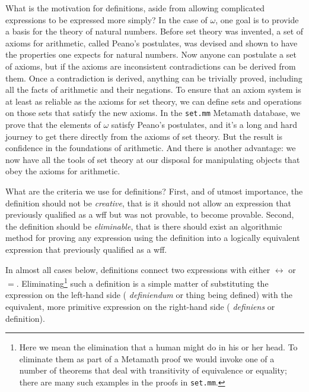 What is the motivation for definitions, aside from allowing complicated
expressions to be expressed more simply?  In the case of  $\omega$, one goal is
to provide a basis for the theory of natural numbers.
Before set theory was invented, a set of axioms for arithmetic, called Peano's
postulates, was devised and shown to have the
properties one expects for natural numbers.  Now anyone can postulate a
set of axioms, but if the axioms are inconsistent contradictions can be derived
from them.  Once a contradiction is derived, anything can be trivially
proved, including
all the facts of arithmetic and their negations.  To ensure that an
axiom system is at least as reliable as the axioms for set theory, we can
define sets and operations on those sets that satisfy the new axioms. In the
\texttt{set.mm} Metamath database, we prove that the elements of $\omega$ satisfy
Peano's postulates, and it's a long and hard journey to get there directly
from the axioms of set theory.  But the result is confidence in the
foundations of arithmetic.  And there is another advantage:  we now have all
the tools of set theory at our disposal for manipulating objects that obey the
axioms for arithmetic.

What are the criteria we use for definitions?  First, and of utmost importance,
the definition should not be {\em creative}, that
is it should not allow an expression that previously qualified as a wff but
was not provable, to become provable.   Second, the definition should be {\em
eliminable}, that is there should exist an
algorithmic method for proving any expression using the definition into
a logically equivalent expression that previously qualified as a wff.

In almost all cases below, definitions connect two expressions with either
$\leftrightarrow$ or $=$.  Eliminating\footnote{Here we mean the
elimination that a human might do in his or her head.  To eliminate them as
part of a Metamath proof we would invoke one of a number of
theorems that deal with transitivity of equivalence or equality; there are
many such examples in the proofs in \texttt{set.mm}.} such a definition is a
simple matter of substituting the expression on the left-hand side ({\em
definiendum} or thing being defined) with the equivalent,
more primitive expression on the right-hand side ({\em
definiens} or definition).

